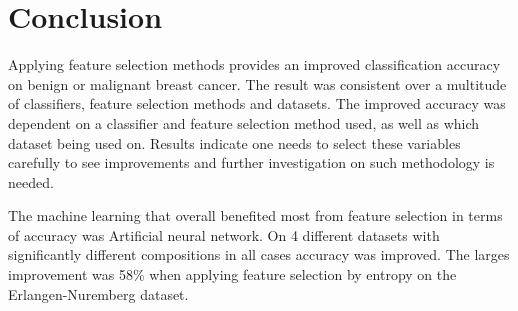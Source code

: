 \chapter{Conclusion}



Applying feature selection methods provides an improved classification accuracy on benign or malignant breast cancer. The result was consistent over a multitude of classifiers, feature selection methods and datasets. The improved accuracy was dependent on a classifier and feature selection method used, as well as which dataset being used on. Results indicate one needs to select these variables carefully to see improvements and further investigation on such methodology is needed.

The machine learning that overall benefited most from feature selection in terms of accuracy was Artificial neural network. On 4 different datasets with significantly different compositions in all cases accuracy was improved. The larges improvement was 58\% when applying feature selection by entropy on the Erlangen-Nuremberg dataset.
